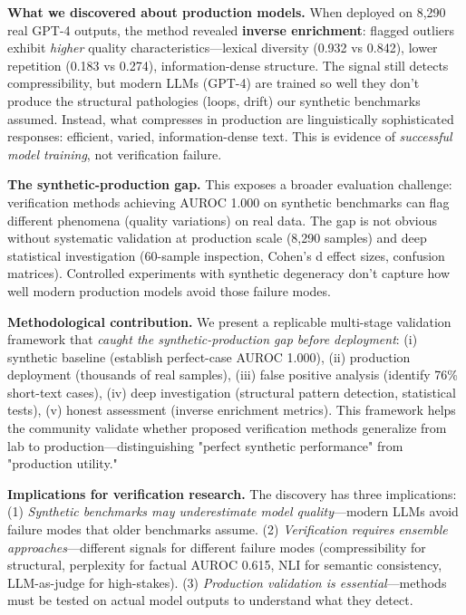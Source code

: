 \documentclass[11pt]{article}
\begin{document}
\textbf{What we discovered about production models.} When deployed on 8,290 real GPT-4 outputs, the method revealed \textbf{inverse enrichment}: flagged outliers exhibit \textit{higher} quality characteristics---lexical diversity (0.932 vs 0.842), lower repetition (0.183 vs 0.274), information-dense structure. The signal still detects compressibility, but modern LLMs (GPT-4) are trained so well they don't produce the structural pathologies (loops, drift) our synthetic benchmarks assumed. Instead, what compresses in production are linguistically sophisticated responses: efficient, varied, information-dense text. This is evidence of \textit{successful model training}, not verification failure.

\textbf{The synthetic-production gap.} This exposes a broader evaluation challenge: verification methods achieving AUROC 1.000 on synthetic benchmarks can flag different phenomena (quality variations) on real data. The gap is not obvious without systematic validation at production scale (8,290 samples) and deep statistical investigation (60-sample inspection, Cohen's d effect sizes, confusion matrices). Controlled experiments with synthetic degeneracy don't capture how well modern production models avoid those failure modes.

\textbf{Methodological contribution.} We present a replicable multi-stage validation framework that \textit{caught the synthetic-production gap before deployment}: (i) synthetic baseline (establish perfect-case AUROC 1.000), (ii) production deployment (thousands of real samples), (iii) false positive analysis (identify 76\% short-text cases), (iv) deep investigation (structural pattern detection, statistical tests), (v) honest assessment (inverse enrichment metrics). This framework helps the community validate whether proposed verification methods generalize from lab to production---distinguishing "perfect synthetic performance" from "production utility."

\textbf{Implications for verification research.} The discovery has three implications: (1) \textit{Synthetic benchmarks may underestimate model quality}---modern LLMs avoid failure modes that older benchmarks assume. (2) \textit{Verification requires ensemble approaches}---different signals for different failure modes (compressibility for structural, perplexity for factual AUROC 0.615, NLI for semantic consistency, LLM-as-judge for high-stakes). (3) \textit{Production validation is essential}---methods must be tested on actual model outputs to understand what they detect.
\end{document}
